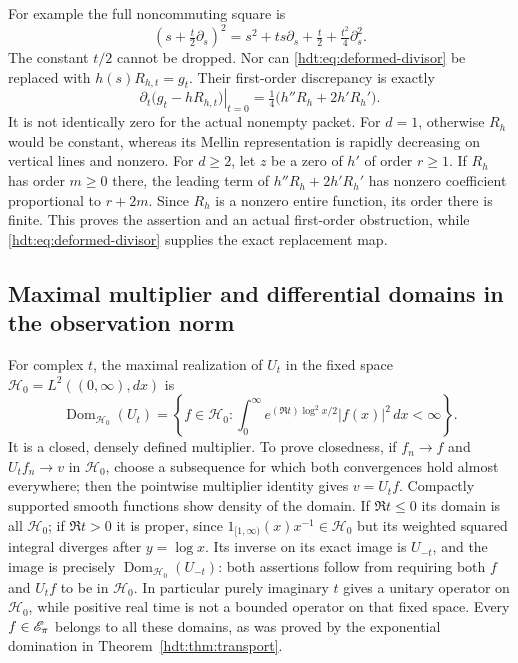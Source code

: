 \documentclass[11pt]{article}
\begin{document}
For example the full noncommuting square is
\begin{equation}\label{hdt:eq:noncommuting-square}
\left(s+\tfrac t2\partial_s\right)^2
=s^2+t s\partial_s+\tfrac t2+\tfrac{t^2}{4}\partial_s^2.
\end{equation}
The constant $t/2$ cannot be dropped. Nor can
\eqref{hdt:eq:deformed-divisor} be replaced with $h(s)R_{h,t}=g_t$.
Their first-order discrepancy is exactly
\begin{equation}\label{hdt:eq:discrepancy}
\left.\partial_t\bigl(g_t-hR_{h,t}\bigr)\right|_{t=0}
=\tfrac14\bigl(h''R_h+2h'R_h'\bigr).
\end{equation}
It is not identically zero for the actual nonempty packet.
For $d=1$, otherwise $R_h$ would be constant, whereas its Mellin
representation is rapidly decreasing on vertical lines and nonzero.
For $d\geq2$, let $z$ be a zero of $h'$ of order $r\geq1$.
If $R_h$ has order $m\geq0$ there, the leading term of
$h''R_h+2h'R_h'$ has nonzero coefficient proportional to $r+2m$.
Since $R_h$ is a nonzero entire function, its order there is finite.
This proves the assertion and an actual first-order obstruction,
while \eqref{hdt:eq:deformed-divisor} supplies the exact replacement map.

\subsection{Maximal multiplier and differential domains in the observation norm}
For complex $t$, the maximal realization of $U_t$ in the fixed
space $\mathcal H_0=L^2((0,\infty),dx)$ is
\begin{equation}\label{hdt:eq:maximal-multiplier}
\operatorname{Dom}_{\mathcal H_0}(U_t)=
\left\{f\in\mathcal H_0:\int_0^\infty
e^{(\Re t)\log^2x/2}|f(x)|^2\,dx<\infty\right\}.
\end{equation}
It is a closed, densely defined multiplier. To prove closedness,
if $f_n\to f$ and $U_tf_n\to v$ in $\mathcal H_0$, choose a subsequence
for which both convergences hold almost everywhere; then the
pointwise multiplier identity gives $v=U_tf$. Compactly supported
smooth functions show density of the domain. If $\Re t\leq0$ its
domain is all $\mathcal H_0$; if $\Re t>0$ it is proper, since
$1_{[1,\infty)}(x)x^{-1}\in\mathcal H_0$ but its weighted squared integral
diverges after $y=\log x$. Its inverse on its exact image is $U_{-t}$,
and the image is precisely $\operatorname{Dom}_{\mathcal H_0}(U_{-t})$:
both assertions follow from requiring both $f$ and $U_tf$ to be in
$\mathcal H_0$. In particular purely imaginary $t$ gives a unitary operator
on $\mathcal H_0$, while positive real time is not a bounded operator on
that fixed space. Every $f\in\mathscr E_\pi$ belongs to all these domains,
as was proved by the exponential domination in
Theorem~\ref{hdt:thm:transport}.
\end{document}
